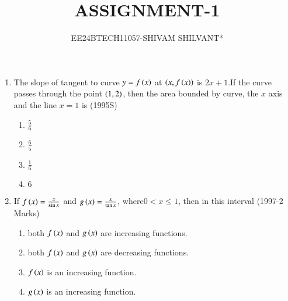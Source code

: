 \documentclass[journal,12pt,twocolumn]{IEEEtran}
\theoremstyle{remark}
\begin{document}

\vspace{3cm}

\title{ASSIGNMENT-1}
\author{EE24BTECH11057-SHIVAM SHILVANT*}
\maketitle
\newpage
\bigskip

\renewcommand{\thefigure}{\theenumi}
\renewcommand{\thetable}{\theenumi}
\begin{enumerate}[start=9]
	\item The slope of tangent to curve $y=f\left(x\right)$ at $\left(x,f\left(x\right)\right)$ is $2x + 1$.If the curve passes through the point $\left(1,2\right)$, then the area bounded by curve, the $x$ axis and the line $x=1$ is
\hfill (1995S)
\begin{enumerate}
    \item $\frac{5}{6}$\\ 
    \item $\frac{6}{5}$\\
    \item $\frac{1}{6}$\\ 
    \item $6$\\
\end{enumerate}
\item If $f\left(x\right)=\frac{x}{\sin{x}}$ and $g\left(x\right)=\frac{x}{\tan{x}}$, where$0<x\leq1$, then in this interval
	\hfill (1997-2 Marks)
\begin{enumerate}
	\item both $f\left(x\right)$ and $g\left(x\right)$ are increasing functions.
	\item both $f\left(x\right)$ and $g\left(x\right)$ are decreasing functions.
	\item $f\left(x\right)$ is an increasing function.
        \item $g\left(x\right)$ is an increasing function.\\
\end{enumerate}


\end{enumerate}
\end{document}
